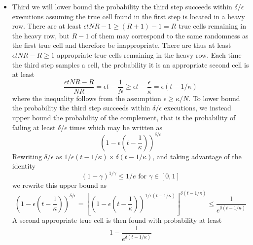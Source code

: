 \begin{itemize}
    \item
    Third we will lower bound the probability the third step succeeds within $\delta/\epsilon$ executions assuming the true cell found in the first step is located in a heavy row.
    There are at least $\epsilon tNR-1 \geq (R+1)-1 = R$ true cells remaining in the heavy row, but $R-1$ of them may correspond to the same randomness as the first true cell and therefore be inappropriate.
    There are thus at least $\epsilon tNR-R \geq 1$ appropriate true cells remaining in the heavy row.
    Each time the third step samples a cell, the probability it is an appropriate second cell is at least
    \begin{equation}
        \frac{\epsilon tNR-R}{NR} = \epsilon t - \frac{1}{N}
        \geq \epsilon t - \frac{\epsilon}{\kappa} = \epsilon(t-1/\kappa)
    \end{equation}
    where the inequality follows from the assumption $\epsilon \geq \kappa/N$.
    To lower bound the probability the third step succeeds within $\delta/\epsilon$ executions, we instead upper bound the probability of the complement, that is the probability of failing at least $\delta/\epsilon$ times which may be written as
    \begin{equation}
        \left(1 - \epsilon\left(t-\frac{1}{\kappa}\right)\right)^{\delta/\epsilon}
    \end{equation}
    Rewriting $\delta/\epsilon$ as $1/\epsilon(t-1/\kappa) \times \delta(t-1/\kappa)$, and taking advantage of the identity
    \begin{equation}
        (1-\gamma)^{1/\gamma} \leq 1/e \text{ for } \gamma\in[0,1]
    \end{equation}
    we rewrite this upper bound as
    \begin{equation}
        \left(1 - \epsilon\left(t-\frac{1}{\kappa}\right)\right)^{\delta/\epsilon}
        = \left[\left(1 - \epsilon\left(t-\frac{1}{\kappa}\right)\right)^{1/\epsilon(t-1/\kappa)}\right]^{\delta(t-1/\kappa)}
        \leq \frac{1}{e^{\delta(t-1/\kappa)}}
    \end{equation}
    A second appropriate true cell is then found with probability at least
    \begin{equation}
        1 - \frac{1}{e^{\delta(t-1/\kappa)}}
    \end{equation}
\end{itemize}

